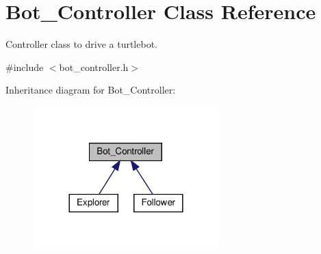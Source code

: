 \hypertarget{class_bot___controller}{}\section{Bot\+\_\+\+Controller Class Reference}
\label{class_bot___controller}


Controller class to drive a turtlebot.  




{\ttfamily \#include $<$bot\+\_\+controller.\+h$>$}



Inheritance diagram for Bot\+\_\+\+Controller\+:
\nopagebreak
\begin{figure}[H]
\begin{center}
\leavevmode
\includegraphics[width=204pt]{class_bot___controller__inherit__graph}
\end{center}
\end{figure}
